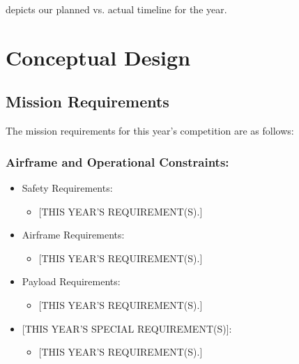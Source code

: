 \documentclass[report]{byu-aero}
\begin{document}
 depicts our planned vs. actual timeline for the year.
 \lipsum[2]



\section{Conceptual Design} %
\label{sec:ConceptualDesign}


\subsection{Mission Requirements}
\label{ssec:missionreqs}

The mission requirements for this year's competition are as follows:

\subsubsection{Airframe and Operational Constraints:}
\begin{itemize}
	\item Safety Requirements:
	\begin{itemize}
		\item {\color{\BYUred} [THIS YEAR'S REQUIREMENT(S).]}
	\end{itemize}
	\item Airframe Requirements:
	\begin{itemize}
		\item {\color{\BYUred} [THIS YEAR'S REQUIREMENT(S).]}
	\end{itemize}
	\item Payload Requirements:
	\begin{itemize}
		\item {\color{\BYUred} [THIS YEAR'S REQUIREMENT(S).]}
	\end{itemize}
	\item {\color{\BYUred} [THIS YEAR'S SPECIAL REQUIREMENT(S)]}:
	\begin{itemize}
		\item {\color{\BYUred} [THIS YEAR'S REQUIREMENT(S).]}
	\end{itemize}
\end{itemize}
\end{document}
